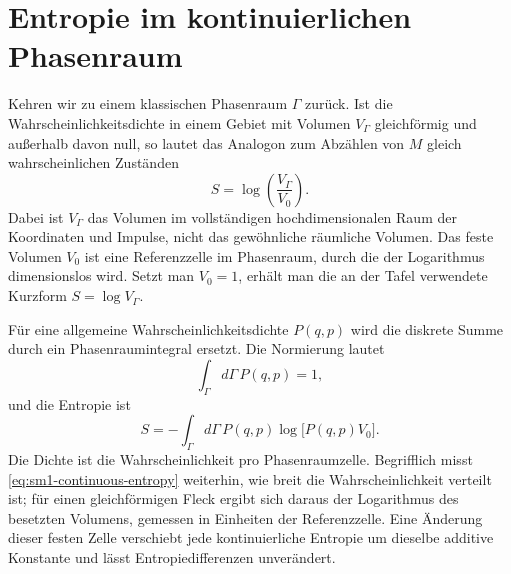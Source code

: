 \begin{classroomqa}
\end{classroomqa}

\section{Entropie im kontinuierlichen Phasenraum}

Kehren wir zu einem klassischen Phasenraum \(\Gamma\) zurück. Ist die Wahrscheinlichkeitsdichte
in einem Gebiet mit Volumen \(V_\Gamma\) gleichförmig und außerhalb davon null, so lautet das
Analogon zum Abzählen von \(M\) gleich wahrscheinlichen Zuständen
\begin{equation}
 S=\log\!\left(\frac{V_\Gamma}{V_0}\right).
 \label{eq:sm1-continuous-uniform}
\end{equation}
Dabei ist \(V_\Gamma\) das Volumen im vollständigen hochdimensionalen Raum der Koordinaten
und Impulse, nicht das gewöhnliche räumliche Volumen. Das feste Volumen \(V_0\) ist eine
Referenzzelle im Phasenraum, durch die der Logarithmus dimensionslos wird. Setzt man
\(V_0=1\), erhält man die an der Tafel verwendete Kurzform \(S=\log V_\Gamma\).

Für eine allgemeine Wahrscheinlichkeitsdichte \(P(q,p)\) wird die diskrete Summe durch ein
Phasenraumintegral ersetzt. Die Normierung lautet
\begin{equation}
 \int_\Gamma d\Gamma\,P(q,p)=1,
 \label{eq:sm1-continuous-normalization}
\end{equation}
und die Entropie ist
\begin{equation}
 S=-\int_\Gamma d\Gamma\,
 P(q,p)\log\!\bigl[P(q,p)V_0\bigr].
 \label{eq:sm1-continuous-entropy}
\end{equation}
Die Dichte ist die Wahrscheinlichkeit pro Phasenraumzelle. Begrifflich misst
\eqref{eq:sm1-continuous-entropy} weiterhin, wie breit die Wahrscheinlichkeit
verteilt ist; für einen gleichförmigen Fleck ergibt sich daraus der Logarithmus des
besetzten Volumens, gemessen in Einheiten der Referenzzelle. Eine Änderung dieser festen
Zelle verschiebt jede kontinuierliche Entropie um dieselbe additive Konstante und lässt
Entropiedifferenzen unverändert.

